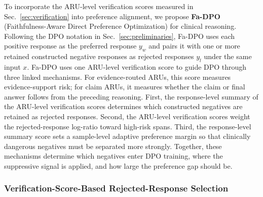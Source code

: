 \documentclass[a4paper,fleqn,doubleblind]{cas-sc}
\begin{document}
\label{sec:dpo}
To incorporate the ARU-level verification scores measured in Sec.~\ref{sec:verification} into preference alignment, we propose \textbf{Fa-DPO} (Faithfulness-Aware Direct Preference Optimization) for clinical reasoning.
Following the DPO notation in Sec.~\ref{sec:preliminaries}, Fa-DPO uses each positive response as the preferred response $y_w$ and pairs it with one or more retained constructed negative responses as rejected responses $y_l$ under the same input $x$.
Fa-DPO uses one ARU-level verification score to guide DPO through three linked mechanisms. For evidence-routed ARUs, this score measures evidence-support risk; for claim ARUs, it measures whether the claim or final answer follows from the preceding reasoning. First, the response-level summary of the ARU-level verification scores determines which constructed negatives are retained as rejected responses. Second, the ARU-level verification scores weight the rejected-response log-ratio toward high-risk spans. Third, the response-level summary score sets a sample-level adaptive preference margin so that clinically dangerous negatives must be separated more strongly. Together, these mechanisms determine which negatives enter DPO training, where the suppressive signal is applied, and how large the preference gap should be.

\subsubsection{Verification-Score-Based Rejected-Response Selection}
\label{sec:retention}
\end{document}
